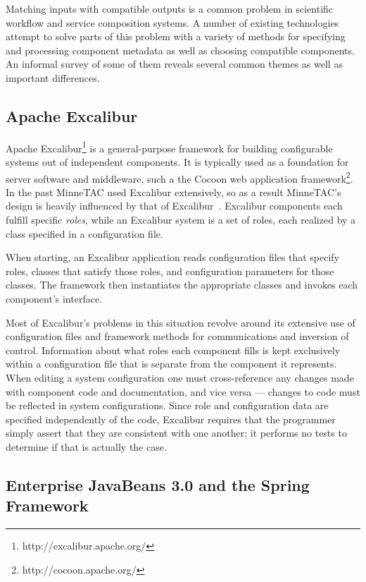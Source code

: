 \documentclass{article}
\begin{document}
Matching inputs with compatible outputs is a common problem in
scientific workflow and service composition systems.  A number of
existing technologies attempt to solve parts of this problem with a
variety of methods for specifying and processing component metadata as
well as choosing compatible components.  An informal survey of some of
them reveals several common themes as well as important differences.

\subsection{Apache Excalibur}

Apache Excalibur\footnote{http://excalibur.apache.org/} is a
general-purpose framework for building configurable systems out of
independent components.  It is typically used as a foundation for
server software and middleware, such a the Cocoon web application
framework\footnote{http://cocoon.apache.org/}.  In the past MinneTAC
used Excalibur extensively, so as a result MinneTAC's design is heavily
influenced by that of Excalibur~\cite{ecra07}.  Excalibur components
each fulfill specific \emph{roles}, while an Excalibur system is a set
of roles, each realized by a class specified in a configuration file.

When starting, an Excalibur application reads configuration files that
specify roles, classes that satisfy those roles, and configuration
parameters for those classes.  The framework then instantiates the
appropriate classes and invokes each component's interface.

Most of Excalibur's problems in this situation revolve around
its extensive use of configuration files and framework methods for
communications and inversion of control.  Information about what roles
each component fills is kept exclusively within a configuration file that
is separate from the component it represents.  When editing a system
configuration one must cross-reference any changes made with component
code and documentation, and vice versa --- changes to code must be
reflected in system configurations.  Since role and configuration data
are specified independently of the code, Excalibur requires that the
programmer simply assert that they are consistent with one another;
it performs no tests to determine if that is actually the case.


\subsection{Enterprise JavaBeans 3.0 and the Spring Framework}
\end{document}
